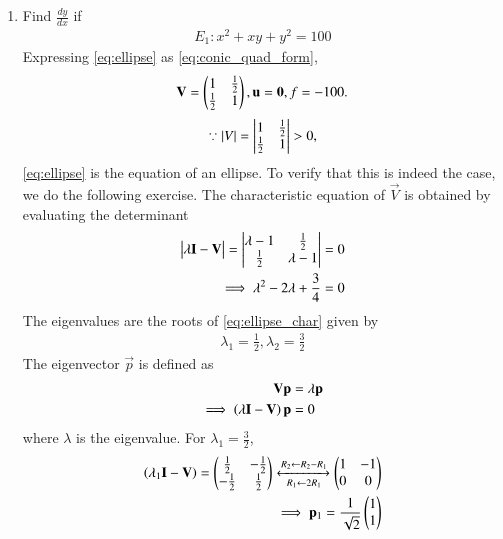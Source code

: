 \renewcommand{\theequation}{\theenumi}
\begin{enumerate}[label=\thesection.\arabic*.,ref=\thesection.\theenumi]
\item 
\label{ex:ellipse_tangent}
Find $\frac{dy}{dx}$ if 
\begin{align}
E_1: x^2 + xy +y^2  = 100
\label{eq:ellipse}
\end{align}
\solution Expressing \eqref{eq:ellipse}  as \eqref{eq:conic_quad_form}, 
\begin{align}
\mathbf{V} = \begin{pmatrix}1 & \frac{1}{2} \\ \frac{1}{2} & 1\end{pmatrix}, \mathbf{u} = \mathbf{0}, f = -100.
\label{eq:ellipse_ips}
\end{align}
%
\begin{align}
\because \left\vert V\right\vert = \begin{vmatrix}1 & \frac{1}{2} \\ \frac{1}{2} & 1\end{vmatrix} > 0,
\end{align}
\eqref{eq:ellipse} is the equation of an ellipse. To verify that this is indeed the case, we do the following exercise.
%
The characteristic equation of $\vec{V}$ is obtained by evaluating the determinant
\begin{align}
\begin{vmatrix}\lambda \mathbf{I}-\mathbf{V}\end{vmatrix} = \begin{vmatrix}\lambda -1 & \frac{1}{2}\\ \frac{1}{2} & \lambda -1\end{vmatrix} &= 0
\\
\implies \lambda^2 - 2\lambda + \frac{3}{4} &= 0
\label{eq:ellipse_char}
\end{align}
The eigenvalues are the roots of \eqref{eq:ellipse_char} given by
\begin{align}
\lambda_1 = \frac{1}{2}, \lambda_2 = \frac{3}{2}
\label{eq:ellipse_eval}
\end{align}
The eigenvector $\vec{p}$ is defined as
\begin{align}
\mathbf{V} \mathbf{p}&= \lambda \mathbf{p}
\\
\implies \left(\lambda\mathbf{I}-\mathbf{V}\right)\mathbf{p} &=0
\end{align}
where $\lambda$ is the eigenvalue.  For $\lambda_1 = \frac{3}{2}$,
\begin{align}
\brak{\lambda_1\vec{I}-\vec{V}}
= \myvec{\frac{1}{2} & -\frac{1}{2}
\\ -\frac{1}{2} & \frac{1}{2}} 
\xleftrightarrow[R_1 \leftarrow 2R_1] {R_2\leftarrow R_2-R_1}\myvec{1 & -1 \\0 & 0 }  
\\
\implies \vec{p}_1 = \frac{1}{\sqrt{2}}\myvec{1 \\ 1}

\end{align}
\end{enumerate}
